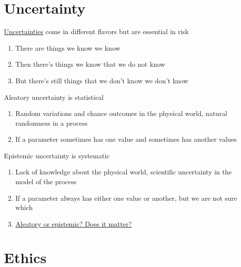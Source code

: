 \documentclass[aspectratio=1610,pdftex,dvipsnames,compress,xcolor={dvipsnames}]{beamer}
\begin{document}
\section{Uncertainty}


\addtocounter{framenumber}{-1}
\begin{frame}{\href{https://uxdesign.cc/the-knowns-and-unknowns-framework-for-design-thinking-6537787de2c5}{Uncertainties} come in different flavors but are essential in risk}
    \begin{enumerate}[series=outerlist,topsep=0pt,itemsep=21pt,leftmargin=*,label=(\arabic*)]
        \item[]There are things we know we know
        \item[]Then there’s things we know that we do not know
        \item[]But there’s still things that we don’t know we don’t know
    \end{enumerate}
\end{frame}


\begin{frame}{Aleatory uncertainty is statistical}
    \begin{enumerate}[series=outerlist,topsep=0pt,itemsep=21pt,leftmargin=*,label=(\arabic*)]
        \item[]Random variations and chance outcomes in the physical world, natural randomness in a process
        \item[]If a parameter sometimes has one value and sometimes has another values
    \end{enumerate}
\end{frame}


\begin{frame}{Epistemic uncertainty is systematic}
    \begin{enumerate}[series=outerlist,topsep=0pt,itemsep=21pt,leftmargin=*,label=(\arabic*)]
        \item[]Lack of knowledge about the physical world, scientific uncertainty in the model of the process
        \item[]If a parameter always has either one value or another, but we are not sure which
        \item[]\href{https://www.sciencedirect.com/science/article/abs/pii/S0167473008000556}{Aleatory or epistemic? Does it matter?}
    \end{enumerate}
\end{frame}


\section{Ethics}
\end{document}
